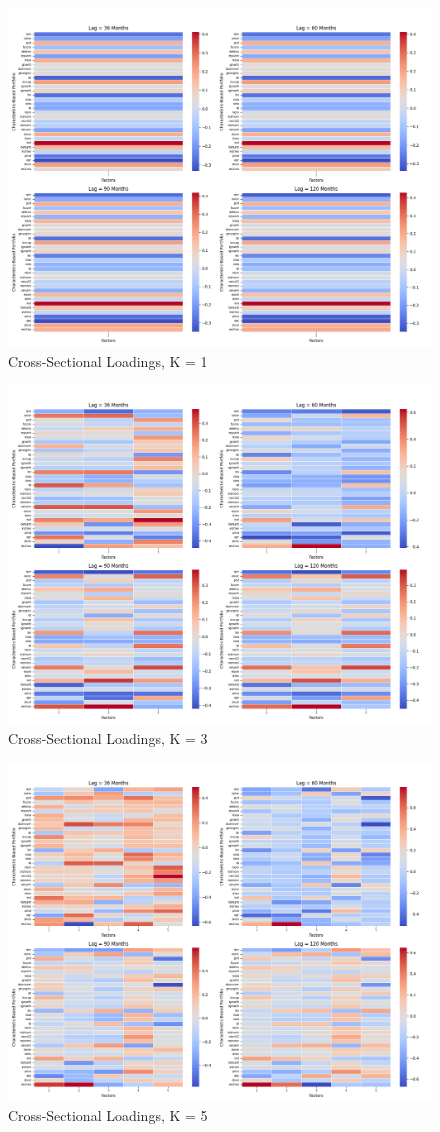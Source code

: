 \documentclass{article}
\begin{document}
\begin{figure}[H]
    \centering
    \includegraphics[width=0.85\linewidth]{B_1.png}
    \caption{Cross-Sectional Loadings, K = 1}
    \label{fig:B_1}
\end{figure}
\begin{figure}[H]
    \centering
    \includegraphics[width=0.85\linewidth]{B_3.png}
    \caption{Cross-Sectional Loadings, K = 3}
    \label{fig:B_3}
\end{figure}
\begin{figure}[H]
    \centering
    \includegraphics[width=0.85\linewidth]{B_5.png}
    \caption{Cross-Sectional Loadings, K = 5}
    \label{fig:B_5}
\end{figure}
\end{document}
